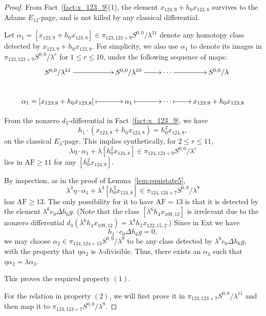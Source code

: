 \documentclass{amsart}
\numberwithin{equation}{section}
\newcommand{\AF}{\mathrm{AF}}
\begin{document}
\begin{proof}
From Fact~\ref{fact:x_123_9}(1), the element $x_{123,9}+h_0x_{123,8}$ survives to the Adams $E_{12}$-page, and is not killed by any classical differential.

Let $\alpha_1 = [x_{123,9}+h_0x_{123,8}] \in \pi_{123,123+9} S^{0,0}/\lambda^{11}$ denote any homotopy class detected by $x_{123,9}+h_0x_{123,8}$. For simplicity, we also use  $\alpha_1$ to denote its images in $\pi_{123,123+9} S^{0,0}/\lambda^r$ for $1 \leq r \leq 10$, under the following sequence of maps:
$$
\xymatrix{
S^{0,0}/\lambda^{11} \ar[r] & S^{0,0}/\lambda^{10} \ar[r] & \cdots \ar[r] & S^{0,0}/\lambda \\
\alpha_1 = [x_{123,9}+h_0x_{123,8}] \ar@{|->}[r] & \alpha_1 \ar@{|->}[r] & \cdots \ar@{|->}[r] & x_{123,9}+h_0x_{123,8}
}$$

From the nonzero $d_2$-differential in Fact~\ref{fact:x_123_9},  we have 
$$h_1 \cdot (x_{123,9}+h_0x_{123,8}) = h_0^2x_{124,8},$$
on the classical $E_3$-page. This implies synthetically, for $2 \leq r \leq 11$,
$$\lambda \eta \cdot \alpha_1 + \lambda [h_0^2 x_{124,8}] \in \pi_{124,124+9} S^{0,0}/\lambda^r$$
lies in $\AF \ge 11$ for any $[h_0^2 x_{124,8}]$.


By inspection, as in the proof of Lemma~\ref{lem:equistate5}, $$\lambda^3 \eta \cdot \alpha_1 + \lambda^3 [h_0^2 x_{124,8}] \in \pi_{124,124+7} S^{0,0}/\lambda^9$$
has $\AF \ge 13$. The only possibility for it to have $\AF=13$ is that it is detected by the element $\lambda^6 e_0 \Delta h_6g$. (Note that the class $[\lambda^6 h_4 x_{109,12}]$ is irrelevant due to the nonzero differential $d_3(\lambda^6 h_4 x_{109,12}) = \lambda^8 h_1x_{122,15,2}$.) Since in Ext we have 
$$h_1 \cdot e_0 \Delta h_6g = 0,$$
we may choose $\alpha_2 \in \pi_{124,124+13} S^{0,0}/\lambda^9$ to be any class detected by $\lambda^6 e_0 \Delta h_6g$, with the property that $\eta \alpha_2$ is $\lambda$-divisible. Thus, there exists an $\alpha_3$ such that $\eta \alpha_2 = \lambda  \alpha_3$.

This proves the required property $(1)$.

For the relation in property $(2)$, we will first prove it in $\pi_{123,123+7} S^{0,0}/\lambda^{11}$ and then map it to $\pi_{123,123+7} S^{0,0}/\lambda^9$.


\end{proof}
\end{document}
